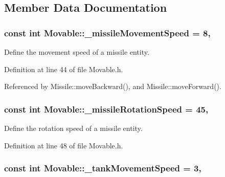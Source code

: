 \subsection{Member Data Documentation}
\hypertarget{classMovable_aff7e2a3e3d5a6059c4fe138aa47dc048}{
\subsubsection[{\-\_\-missile\-Movement\-Speed}]{\setlength{\rightskip}{0pt plus 5cm}const int Movable\-::\-\_\-missile\-Movement\-Speed = 8\hspace{0.3cm}{\ttfamily [static]}, {\ttfamily [protected]}}}\label{classMovable_aff7e2a3e3d5a6059c4fe138aa47dc048}


Define the movement speed of a missile entity. 



Definition at line 44 of file Movable.\-h.



Referenced by Missile\-::move\-Backward(), and Missile\-::move\-Forward().

\hypertarget{classMovable_afde3611f73293d67497a39fed061e3a8}{
\subsubsection[{\-\_\-missile\-Rotation\-Speed}]{\setlength{\rightskip}{0pt plus 5cm}const int Movable\-::\-\_\-missile\-Rotation\-Speed = 45\hspace{0.3cm}{\ttfamily [static]}, {\ttfamily [protected]}}}\label{classMovable_afde3611f73293d67497a39fed061e3a8}


Define the rotation speed of a missile entity. 



Definition at line 48 of file Movable.\-h.

\hypertarget{classMovable_a54cb7d3465cc78ad7d8b2f7c2d842732}{
\subsubsection[{\-\_\-tank\-Movement\-Speed}]{\setlength{\rightskip}{0pt plus 5cm}const int Movable\-::\-\_\-tank\-Movement\-Speed = 3\hspace{0.3cm}{\ttfamily [static]}, {\ttfamily [protected]}}}\label{classMovable_a54cb7d3465cc78ad7d8b2f7c2d842732}


